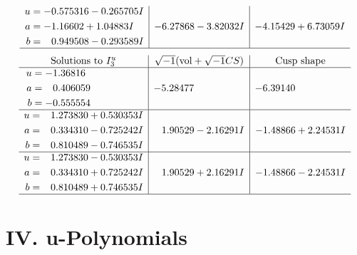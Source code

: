 \documentclass[1p]{elsarticle_modified}
\theoremstyle{definition}
\newcommand{\I}{\sqrt{-1}}
\begin{document}
$$\begin{array}{c|c|c}
\begin{aligned}
u &= -0.575316 - 0.265705 I \\
a &= -1.16602 + 1.04883 I \\
b &= \phantom{-}0.949508 - 0.293589 I\end{aligned}
 & -6.27868 - 3.82032 I & -4.15429 + 6.73059 I\\
 \hline 
 \end{array}$$\newpage$$\begin{array}{c|c|c}  
\text{Solutions to }I^u_{3}& \I (\text{vol} + \sqrt{-1}CS) & \text{Cusp shape}\\
 \hline 
\begin{aligned}
u &= -1.36816\phantom{ +0.000000I} \\
a &= \phantom{-}0.406059\phantom{ +0.000000I} \\
b &= -0.555554\phantom{ +0.000000I}\end{aligned}
 & -5.28477\phantom{ +0.000000I} & -6.39140\phantom{ +0.000000I} \\ \hline\begin{aligned}
u &= \phantom{-}1.273830 + 0.530353 I \\
a &= \phantom{-}0.334310 - 0.725242 I \\
b &= \phantom{-}0.810489 - 0.746535 I\end{aligned}
 & \phantom{-}1.90529 - 2.16291 I & -1.48866 + 2.24531 I \\ \hline\begin{aligned}
u &= \phantom{-}1.273830 - 0.530353 I \\
a &= \phantom{-}0.334310 + 0.725242 I \\
b &= \phantom{-}0.810489 + 0.746535 I\end{aligned}
 & \phantom{-}1.90529 + 2.16291 I & -1.48866 - 2.24531 I\\
 \hline 
 \end{array}$$\newpage
\newpage\renewcommand{\arraystretch}{1}
\centering \section*{ IV. u-Polynomials}
\end{document}
